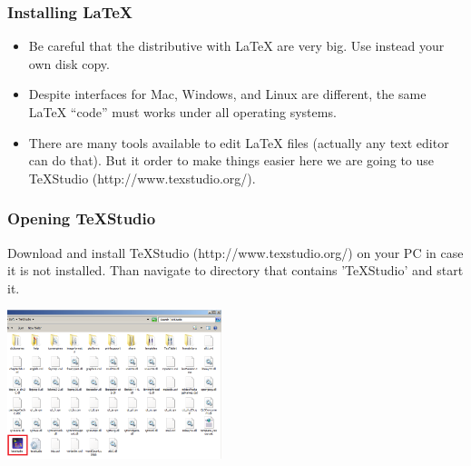 \documentclass[slidestop,compress,mathserif]{beamer}
\begin{document}
\begin{frame} \frametitle{Installing LaTeX}
	
	\begin{itemize}
		\item Be careful that the distributive with LaTeX are very big. Use instead your own disk copy.
		\item Despite interfaces for Mac, Windows, and Linux are different, the same LaTeX ``code'' must works under all operating systems.
		\item There are many tools available to edit LaTeX files (actually any text editor can do that). But it order to make things easier here we are going to use TeXStudio ({\color{highlight}http://www.texstudio.org/}).
	\end{itemize}
	
\end{frame}


\begin{frame} \frametitle{Opening TeXStudio}
	Download and install TeXStudio ({\color{highlight}http://www.texstudio.org/}) on your PC in case it is not installed. Than navigate to directory that contains 'TeXStudio' and start it.

	\begin{center}
		\includegraphics[height=1.7in]{basicsOfLatex/gettingStarted/texstudioFolder}
	\end{center}
\end{frame}
\end{document}
